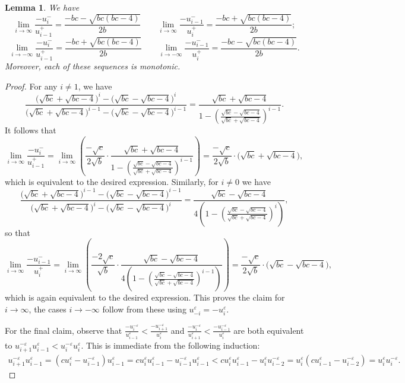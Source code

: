 \documentclass{amsart}
\newtheorem{lemma}[theorem]{Lemma}
\numberwithin{theorem}{section}
\begin{document}
  \begin{lemma}
    We have
    \[\lim_{i\to\infty} \frac{-u_i^-}{u_{i-1}^+}=\frac{-bc-\sqrt{bc(bc-4)}}{2b} \qquad \lim_{i\to\infty} \frac{-u_{i-1}^-}{u_i^+}=\frac{-bc+\sqrt{bc(bc-4)}}{2b};\]
    \[\lim_{i\to-\infty} \frac{-u_i^-}{u_{i-1}^+}=\frac{-bc+\sqrt{bc(bc-4)}}{2b} \qquad \lim_{i\to-\infty} \frac{-u_{i-1}^-}{u_i^+}=\frac{-bc-\sqrt{bc(bc-4)}}{2b}.\]
    Moreover, each of these sequences is monotonic.
  \end{lemma}
  \begin{proof}
    For any $i\ne1$, we have
    \[\frac{\big(\sqrt{bc}+\sqrt{bc-4}\big)^i-\big(\sqrt{bc}-\sqrt{bc-4}\big)^i}{\big(\sqrt{bc}+\sqrt{bc-4}\big)^{i-1}-\big(\sqrt{bc}-\sqrt{bc-4}\big)^{i-1}}=\frac{\sqrt{bc}+\sqrt{bc-4}}{1-\left(\frac{\sqrt{bc}-\sqrt{bc-4}}{\sqrt{bc}+\sqrt{bc-4}}\right)^{i-1}}.\]
    It follows that
    \[\lim_{i\to\infty} \frac{-u_i^-}{u_{i-1}^+} = \lim_{i\to\infty} \left( \frac{-\sqrt{c}}{2\sqrt{b}}\cdot\frac{\sqrt{bc}+\sqrt{bc-4}}{1-\left(\frac{\sqrt{bc}-\sqrt{bc-4}}{\sqrt{bc}+\sqrt{bc-4}}\right)^{i-1}} \right) = \frac{-\sqrt{c}}{2\sqrt{b}}\cdot\big(\sqrt{bc}+\sqrt{bc-4}\big),\]
    which is equivalent to the desired expression.
    Similarly, for $i\ne0$ we have
    \[\frac{\big(\sqrt{bc}+\sqrt{bc-4}\big)^{i-1}-\big(\sqrt{bc}-\sqrt{bc-4}\big)^{i-1}}{\big(\sqrt{bc}+\sqrt{bc-4}\big)^i-\big(\sqrt{bc}-\sqrt{bc-4}\big)^i}=\frac{\sqrt{bc}-\sqrt{bc-4}}{4\left(1-\left(\frac{\sqrt{bc}-\sqrt{bc-4}}{\sqrt{bc}+\sqrt{bc-4}}\right)^i\right)},\]
    so that
    \[\lim_{i\to\infty} \frac{-u_{i-1}^-}{u_i^+} = \lim_{i\to\infty} \left( \frac{-2\sqrt{c}}{\sqrt{b}}\cdot\frac{\sqrt{bc}-\sqrt{bc-4}}{4\left(1-\left(\frac{\sqrt{bc}-\sqrt{bc-4}}{\sqrt{bc}+\sqrt{bc-4}}\right)^{i-1}\right)} \right) = \frac{-\sqrt{c}}{2\sqrt{b}}\cdot\big(\sqrt{bc}-\sqrt{bc-4}\big),\]
    which is again equivalent to the desired expression.
    This proves the claim for $i\to\infty$, the cases $i\to-\infty$ follow from these using $u_{-i}^\varepsilon=-u_i^\varepsilon$.

    For the final claim, observe that $\frac{-u_i^{-\varepsilon}}{u_{i-1}^\varepsilon}<\frac{-u_{i+1}^{-\varepsilon}}{u_i^\varepsilon}$ and $\frac{-u_i^{-\varepsilon}}{u_{i+1}^\varepsilon}<\frac{-u_{i-1}^{-\varepsilon}}{u_i^\varepsilon}$ are both equivalent to $u_{i+1}^{-\varepsilon}u_{i-1}^\varepsilon<u_i^{-\varepsilon}u_i^\varepsilon$.
    This is immediate from the following induction:
    \begin{align*}
      u_{i+1}^{-\varepsilon}u_{i-1}^\varepsilon
      =(cu_i^\varepsilon-u_{i-1}^{-\varepsilon})u_{i-1}^\varepsilon
      =cu_i^\varepsilon u_{i-1}^\varepsilon-u_{i-1}^{-\varepsilon} u_{i-1}^\varepsilon
      <cu_i^\varepsilon u_{i-1}^\varepsilon-u_i^\varepsilon u_{i-2}^{-\varepsilon}
      =u_i^\varepsilon(cu_{i-1}^\varepsilon-u_{i-2}^{-\varepsilon})
      =u_i^\varepsilon u_i^{-\varepsilon}.
    \end{align*}
  \end{proof}
\end{document}
